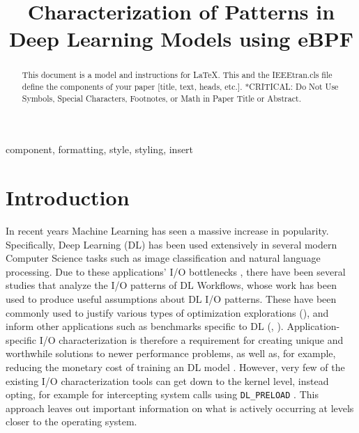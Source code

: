 \documentclass[conference]{IEEEtran}
\begin{document}
\title{Characterization of Patterns in Deep Learning Models using eBPF\\
}

\author{
	\and
	\and
}

\maketitle

\begin{abstract}
	This document is a model and instructions for \LaTeX.
	This and the IEEEtran.cls file define the components of your paper [title, text, heads, etc.]. *CRITICAL: Do Not Use Symbols, Special Characters, Footnotes,
	or Math in Paper Title or Abstract.
\end{abstract}

\begin{IEEEkeywords}
	component, formatting, style, styling, insert
\end{IEEEkeywords}

\section{Introduction}
In recent years Machine Learning has seen a massive increase in popularity.
Specifically, Deep Learning (DL) has been used extensively in several modern Computer Science tasks such as image classification
and natural language processing.
Due to these applications' I/O bottlenecks \cite{beegfsDL}, there have been several studies that analyze the I/O patterns of DL Workflows, whose work
has been used to produce useful assumptions about DL I/O patterns. These have been commonly used to
justify various types of optimization explorations (\cite{LMDB, nvme, beegfsDL, bamboo}), and inform
other applications such as benchmarks specific to DL (\cite{TFbenchmark}, \cite{OanaDL}).
Application-specific I/O characterization is therefore a requirement for creating
unique and worthwhile solutions to
newer performance problems, as well as, for example, reducing the monetary cost of training an
DL model \cite{bamboo}. However, very few of the existing I/O characterization tools
can get down to the kernel level, instead opting, for example for intercepting system calls using \texttt{DL\_PRELOAD} \cite{HPCIODarshan}. This approach leaves out important information on what is actively occurring at levels closer to the operating system.
\end{document}
